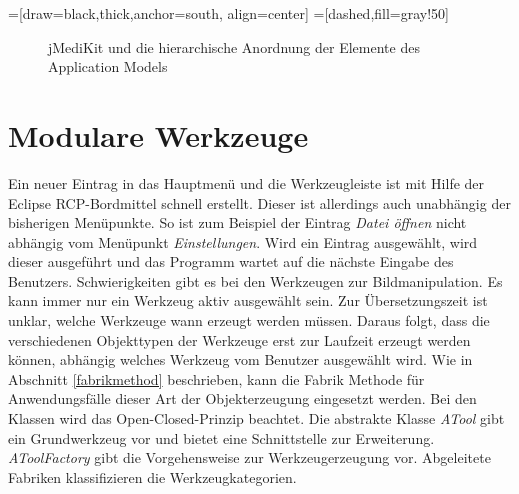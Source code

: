 =[draw=black,thick,anchor=south, align=center]
=[dashed,fill=gray!50]
\begin{figure}[htbp]
\centering
\caption{jMediKit und die hierarchische Anordnung der Elemente des Application Models}
\label{hierarchy}
\end{figure}

\section{Modulare Werkzeuge}
Ein neuer Eintrag in das Hauptmenü und die Werkzeugleiste ist mit Hilfe der Eclipse RCP-Bordmittel schnell erstellt. Dieser ist allerdings auch unabhängig der bisherigen Menüpunkte. So ist zum Beispiel der Eintrag \textit{Datei öffnen} nicht abhängig vom Menüpunkt \textit{Einstellungen}. Wird ein Eintrag ausgewählt, wird dieser ausgeführt und das Programm wartet auf die nächste Eingabe des Benutzers. Schwierigkeiten gibt es bei den Werkzeugen zur Bildmanipulation. Es kann immer nur ein Werkzeug aktiv ausgewählt sein. Zur Übersetzungszeit ist unklar, welche Werkzeuge wann erzeugt werden müssen. Daraus folgt, dass die verschiedenen Objekttypen der Werkzeuge erst zur Laufzeit erzeugt werden können, abhängig welches Werkzeug vom Benutzer ausgewählt wird. Wie in Abschnitt \ref{fabrikmethod} beschrieben, kann die Fabrik Methode für Anwendungsfälle dieser Art der Objekterzeugung eingesetzt werden. Bei den Klassen wird das Open-Closed-Prinzip beachtet. Die abstrakte Klasse \textit{ATool} gibt ein Grundwerkzeug vor und bietet eine Schnittstelle zur Erweiterung. \textit{AToolFactory} gibt die Vorgehensweise zur Werkzeugerzeugung vor. Abgeleitete Fabriken klassifizieren die Werkzeugkategorien.

